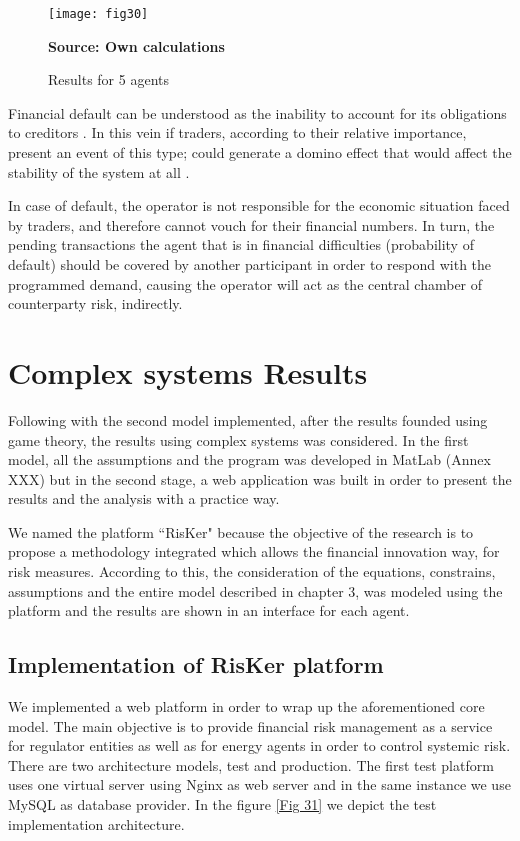 \documentclass[12pt]{book}
\begin{document}
\begin{figure}  
\centering    
\texttt{[image: fig30]}  
\caption{Results for 5 agents}
\scriptsize 
\textbf{Source: Own calculations}
\captionsetup{justification=centering,margin=1cm}   
\label{Fig 30}
\end{figure}

Financial default can be understood as the inability to account for its obligations to creditors \cite{whited2006}. In this vein if traders, according to their relative importance, present an event of this type; could generate a domino effect that would affect the stability of the system at all \cite{dobson2007}. 

In case of default, the operator is not responsible for the economic situation faced by traders, and therefore cannot vouch for their financial numbers. In turn, the pending transactions the agent that is in financial difficulties (probability of default) should be covered by another participant in order to respond with the programmed demand, causing the operator will act as the central chamber of counterparty risk, indirectly. 

\section{Complex systems Results}

Following with the second model implemented, after the results founded using game theory, the results using complex systems was considered. In the first model, all the assumptions and the program was developed in MatLab (Annex XXX) but in the second stage, a web application was built in order to present the results and the analysis with a practice way.

We named the platform ``RisKer" because the objective of the research is to propose a methodology integrated which allows the financial innovation way, for risk measures. According to this, the consideration of the equations, constrains, assumptions and the entire model described in chapter 3, was modeled using the platform and the results are shown in an interface for each agent.

\subsection{Implementation of RisKer platform}

We implemented a web platform in order to wrap up the aforementioned core model. The main objective is to provide financial risk management as a service for regulator entities as well as for energy agents in order to control systemic risk. There are two architecture models, test and production. The first test platform uses one virtual server using Nginx as web server and in the same instance we use MySQL as database provider. In the figure \ref{Fig 31} we depict the test implementation architecture.
\end{document}
